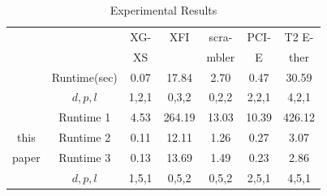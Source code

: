 \documentclass[journal]{IEEEtran}
\begin{document}
\begin{table}[t]
\centering
\caption{Experimental Results}
\begin{tabular}{|c|c|c|c|c|c|c|}
\hline
&                                        &XG-     &XFI       &scra-     &PCI-    &T2 E-\\
&                                        &XS      &          &mbler     &E       &ther\\\hline
[10]&Runtime(sec)   &0.07    &17.84     &2.70      &0.47    &30.59\\\cline{2-7}
&$d,p,l$                                 &1,2,1   &0,3,2     &0,2,2     &2,2,1   &4,2,1         \\ \hline\hline
    &Runtime 1                           &4.53    & 264.19   &13.03     &10.39   &426.12      \\\cline{2-7}
this&Runtime 2                           &0.11    & 12.11    &1.26      &0.27    &3.07      \\\cline{2-7}
paper&Runtime 3                          &0.13    &13.69     &1.49      &0.23    &2.86      \\\cline{2-7}
    &$d,p,l$                             &1,5,1   &0,5,2     &0,5,2     &2,5,1   &4,5,1          \\ \hline %
\end{tabular}\label{tab_res}
\end{table}
\end{document}
